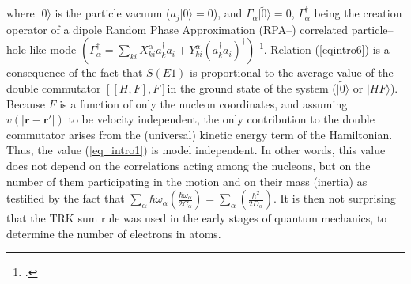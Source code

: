 where $|0\rangle$ is the particle vacuum ($a_j|0\rangle=0$), and $\Gamma_\alpha|\tilde 0\rangle=0$, $\Gamma^\dagger_\alpha$ being the creation operator of a dipole Random Phase Approximation (RPA--) correlated particle--hole like mode $(\Gamma_\alpha^\dagger=\sum_{ki}X_{ki}^\alpha a_k^\dagger a_i+Y^\alpha_{ki}(a_k^\dagger a_i)^\dagger)$ \footnote{\cite{Bertsch:05}.}. Relation (\ref{eqintro6}) is a consequence of the fact that $S(E1)$ is proportional to the average value of the double  commutator $[[H,F],F]$in the ground state of the system ($|\tilde 0\rangle$ or $|HF\rangle$). Because $F$ is a function of only the nucleon coordinates, and assuming $v(|\mathbf{r}-\mathbf{r}'|)$ to be velocity independent, the only contribution to the double commutator arises from the (universal) kinetic energy term of the Hamiltonian. Thus, the value (\ref{eq_intro1}) is model independent. In other words, this value does not depend on the correlations acting among the nucleons, but on the number of them participating in the motion and on their mass (inertia) as testified by the fact that $\sum_{\alpha}\hbar \omega_\alpha\left(\frac{\hbar\omega_\alpha}{2C_\alpha}\right)=\sum_{\alpha}\left(\frac{\hbar^2}{2D_\alpha}\right)$. It is then not surprising that the TRK sum rule was used in the early stages of quantum mechanics, to determine the number of electrons in atoms.


